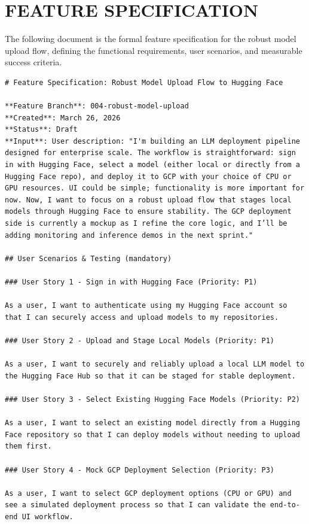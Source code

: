 \documentclass[a4paper,12pt]{report}
\begin{document}
\chapter{FEATURE SPECIFICATION}
The following document is the formal feature specification for the robust model upload flow, defining the functional requirements, user scenarios, and measurable success criteria.

\begin{lstlisting}[caption={Feature Specification (spec.md)}]
# Feature Specification: Robust Model Upload Flow to Hugging Face

**Feature Branch**: 004-robust-model-upload
**Created**: March 26, 2026  
**Status**: Draft  
**Input**: User description: "I'm building an LLM deployment pipeline designed for enterprise scale. The workflow is straightforward: sign in with Hugging Face, select a model (either local or directly from a Hugging Face repo), and deploy it to GCP with your choice of CPU or GPU resources. UI could be simple; functionality is more important for now. Now, I want to focus on a robust upload flow that stages local models through Hugging Face to ensure stability. The GCP deployment side is currently a mockup as I refine the core logic, and I’ll be adding monitoring and inference demos in the next sprint."

## User Scenarios & Testing (mandatory)

### User Story 1 - Sign in with Hugging Face (Priority: P1)

As a user, I want to authenticate using my Hugging Face account so that I can securely access and upload models to my repositories.

### User Story 2 - Upload and Stage Local Models (Priority: P1)

As a user, I want to securely and reliably upload a local LLM model to the Hugging Face Hub so that it can be staged for stable deployment.

### User Story 3 - Select Existing Hugging Face Models (Priority: P2)

As a user, I want to select an existing model directly from a Hugging Face repository so that I can deploy models without needing to upload them first.

### User Story 4 - Mock GCP Deployment Selection (Priority: P3)

As a user, I want to select GCP deployment options (CPU or GPU) and see a simulated deployment process so that I can validate the end-to-end UI workflow.


\end{lstlisting}
\end{document}
